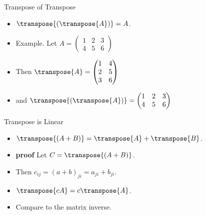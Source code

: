 \documentclass{beamer}
\begin{document}

\begin{frame}{Transpose of Transpose}
\begin{itemize}
\item $\transpose{\left(\transpose{A}\right)} = A$.
\item Example. Let
$
A=
\begin{pmatrix}
1 & 2 & 3 \\
4 & 5 & 6
\end{pmatrix}
$
\item Then
$
\transpose{A} =
\begin{pmatrix}
1 & 4 \\
2 & 5 \\
3 & 6 \\
\end{pmatrix}
$
\item and
$
\transpose{\left(\transpose{A}\right)} =
\begin{pmatrix}
1 & 2 & 3 \\
4 & 5 & 6
\end{pmatrix}
$
\end{itemize}
\end{frame}


\begin{frame}{Transpose is Linear}
\begin{itemize}
\item $\transpose{(A+B)} = \transpose{A} + \transpose{B}$.
\item \textbf{proof} Let $C=\transpose{(A+B)}$.
\item Then $c_{ij}=(a+b)_{ji} = a_{ji} + b_{ji}$.
\item $\transpose{cA} = c\transpose{A}$.
\item Compare to the matrix inverse.
\end{itemize}
\end{frame}

\end{document}
